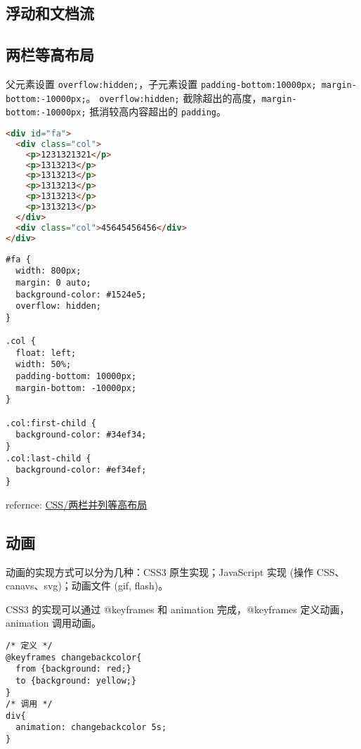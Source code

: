 \subsection{浮动和文档流}\label{ux6d6eux52a8ux548cux6587ux6863ux6d41}

\subsection{两栏等高布局}\label{ux4e24ux680fux7b49ux9ad8ux5e03ux5c40}

父元素设置 \lstinline!overflow:hidden;!，子元素设置
\lstinline!padding-bottom:10000px; margin-bottom:-10000px;!。
\lstinline!overflow:hidden;!
截除超出的高度，\lstinline!margin-bottom:-10000px;! 抵消较高内容超出的
\lstinline!padding!。

\begin{lstlisting}[language=HTML]
<div id="fa">
  <div class="col">
    <p>1231321321</p>
    <p>1313213</p>
    <p>1313213</p>
    <p>1313213</p>
    <p>1313213</p>
    <p>1313213</p>
  </div>
  <div class="col">45645456456</div>
</div>
\end{lstlisting}

\begin{lstlisting}
#fa {
  width: 800px;
  margin: 0 auto;
  background-color: #1524e5;
  overflow: hidden;
}

.col {
  float: left;
  width: 50%;
  padding-bottom: 10000px;
  margin-bottom: -10000px;
}

.col:first-child {
  background-color: #34ef34;
}
.col:last-child {
  background-color: #ef34ef;
}
\end{lstlisting}

refernce:
\href{http://segmentfault.com/a/1190000000625584}{CSS/两栏并列等高布局}

\subsection{动画}\label{ux52a8ux753b}

动画的实现方式可以分为几种：CSS3 原生实现；JavaScript 实现 (操作
CSS、canavs、svg)；动画文件 (gif, flash)。

CSS3 的实现可以通过 @keyframes 和 animation 完成，@keyframes
定义动画，animation 调用动画。

\begin{lstlisting}
/* 定义 */
@keyframes changebackcolor{
  from {background: red;}
  to {background: yellow;}
}
/* 调用 */
div{
  animation: changebackcolor 5s;
}
\end{lstlisting}

